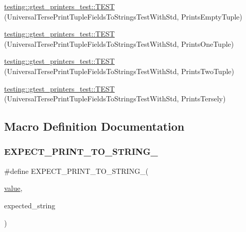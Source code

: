 \begin{DoxyCompactItemize}
\item 
\mbox{\hyperlink{namespacetesting_1_1gtest__printers__test_a4e30c6dbea7bf0ebcfa9b0e0d79e0283}{testing\+::gtest\+\_\+printers\+\_\+test\+::\+T\+E\+ST}} (Universal\+Terse\+Print\+Tuple\+Fields\+To\+Strings\+Test\+With\+Std, Prints\+Empty\+Tuple)
\item 
\mbox{\hyperlink{namespacetesting_1_1gtest__printers__test_a09537ac3801c572e0ce9bade09fd9d79}{testing\+::gtest\+\_\+printers\+\_\+test\+::\+T\+E\+ST}} (Universal\+Terse\+Print\+Tuple\+Fields\+To\+Strings\+Test\+With\+Std, Prints\+One\+Tuple)
\item 
\mbox{\hyperlink{namespacetesting_1_1gtest__printers__test_a2ad138c4bcc4afb2deae1466ad3351f1}{testing\+::gtest\+\_\+printers\+\_\+test\+::\+T\+E\+ST}} (Universal\+Terse\+Print\+Tuple\+Fields\+To\+Strings\+Test\+With\+Std, Prints\+Two\+Tuple)
\item 
\mbox{\hyperlink{namespacetesting_1_1gtest__printers__test_a2121c7c548cc174639947ff8f810759a}{testing\+::gtest\+\_\+printers\+\_\+test\+::\+T\+E\+ST}} (Universal\+Terse\+Print\+Tuple\+Fields\+To\+Strings\+Test\+With\+Std, Prints\+Tersely)
\end{DoxyCompactItemize}


\subsection{Macro Definition Documentation}
\mbox{\label{_obj__test_2lib_2googletest-master_2googletest_2test_2googletest-printers-test_8cc_aa0ed482a6777cce04eecd24c530c78ec}} 
\subsubsection{\texorpdfstring{EXPECT\_PRINT\_TO\_STRING\_}{EXPECT\_PRINT\_TO\_STRING\_}}
{\footnotesize\ttfamily \#define E\+X\+P\+E\+C\+T\+\_\+\+P\+R\+I\+N\+T\+\_\+\+T\+O\+\_\+\+S\+T\+R\+I\+N\+G\+\_\+(\begin{DoxyParamCaption}\item[{}]{\mbox{\hyperlink{_obj__test_2lib_2googletest-master_2googlemock_2test_2gmock-matchers__test_8cc_a337b8a670efc0b086ad3af163f3121b6}{value}},  }\item[{}]{expected\+\_\+string }\end{DoxyParamCaption})}

